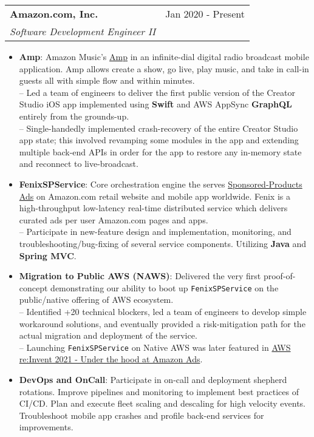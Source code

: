 \documentclass[letterpaper,11pt]{article}
\makeatletter
\newcommand{\resumeItem}[2]{
  \item\small{
    \textbf{#1}{: #2 \vspace{-2pt}}
  }
}
\newcommand{\resumeSubheading}[4]{
  \vspace{-1pt}\item
    \begin{tabular*}{0.97\textwidth}[t]{l@{\extracolsep{\fill}}r}
      \textbf{#1} & #2 \\
      \textit{\small #3} & \textit{\small #4} \\
    \end{tabular*}\vspace{-5pt}
}
\newcommand{\resumeItemListStart}{\begin{itemize}}
\newcommand{\resumeItemListEnd}{\end{itemize}\vspace{-5pt}}
\makeatother
\begin{document}
    \resumeSubheading
      {Amazon.com, Inc.}{Jan 2020 - Present}
      {Software Development Engineer II}{}
      \resumeItemListStart
		\resumeItem{Amp}
          {Amazon Music's \href{https://www.onamp.com/about}{Amp} in an infinite-dial digital radio broadcast mobile application. Amp allows create a show, go live, play music, and take in call-in guests all with simple flow and within minutes.\\
          -- Led a team of engineers to deliver the first public version of the Creator Studio iOS app implemented using \textbf{Swift} and AWS AppSync \textbf{GraphQL} entirely from the grounds-up.\\
          -- Single-handedly implemented crash-recovery of the entire Creator Studio app state; this involved revamping some modules in the app and extending multiple back-end APIs in order for the app to restore any in-memory state and reconnect to live-broadcast.}          
		\resumeItem{FenixSPService}
          {Core orchestration engine the serves \href{https://advertising.amazon.com/solutions/products/sponsored-products}{Sponsored-Products Ads} on Amazon.com retail website and mobile app worldwide. Fenix is a high-throughput low-latency real-time distributed service which delivers curated ads per user Amazon.com pages and apps.\\
          -- Participate in new-feature design and implementation, monitoring, and troubleshooting/bug-fixing of several service components.
          Utilizing \textbf{Java} and \textbf{Spring MVC}.}
        \resumeItem{Migration to Public AWS (NAWS)}
          {Delivered the very first proof-of-concept demonstrating our ability to boot up \texttt{FenixSPService} on the public/native offering of AWS ecosystem.\\
          -- Identified +20 technical blockers, led a team of engineers to develop simple workaround solutions, and eventually provided a risk-mitigation path for the actual migration and deployment of the service.\\
          -- Launching \texttt{FenixSPService} on Native AWS was later featured in \href{https://youtu.be/BS4MPpEO66I?t=1067}{AWS re:Invent 2021 - Under the hood at Amazon Ads}.}
        \resumeItem{DevOps and OnCall}
          {Participate in on-call and deployment shepherd rotations. Improve pipelines and monitoring to implement best practices of CI/CD. Plan and execute fleet scaling and descaling for high velocity events. Troubleshoot mobile app crashes and profile back-end services for improvements.}
	\resumeItemListEnd
\end{document}
